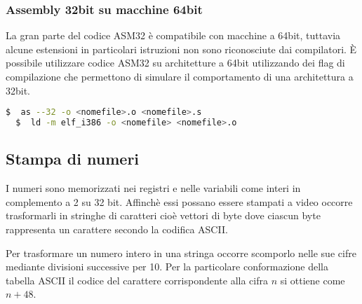 \documentclass[a4paper]{article}
\theoremstyle{break}
\theoremstyle{break}
\theoremstyle{break}
\theoremstyle{break}
\begin{document}
\subsubsection{Assembly 32bit su macchine 64bit}
La gran parte del codice ASM32 è compatibile con macchine a 64bit, tuttavia alcune
estensioni in particolari istruzioni non sono riconosciute dai compilatori. È possibile
utilizzare codice ASM32 su architetture a 64bit utilizzando dei flag di compilazione che
permettono di simulare il comportamento di una architettura a 32bit.
\begin{lstlisting}[language=bash]
  $  as --32 -o <nomefile>.o <nomefile>.s
  $  ld -m elf_i386 -o <nomefile> <nomefile>.o
\end{lstlisting}

\subsection{Stampa di numeri}
I numeri sono memorizzati nei registri e nelle variabili come interi in complemento a 2
su 32 bit. Affinchè essi possano essere stampati a video occorre trasformarli in stringhe
di caratteri cioè vettori di byte dove ciascun byte rappresenta un carattere secondo la
codifica ASCII.

\noindent Per trasformare un numero intero in una stringa occorre scomporlo nelle sue
cifre mediante divisioni successive per 10. Per la particolare conformazione della tabella
ASCII il codice del carattere corrispondente alla cifra \( n \) si ottiene come \( n+48 \).
\end{document}

